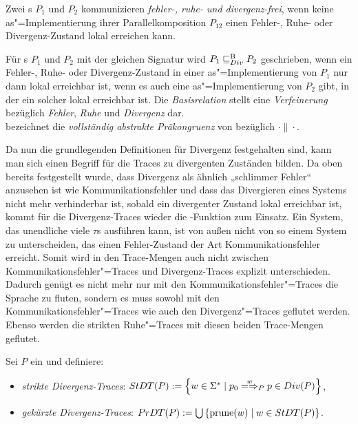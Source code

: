 \begin{Def}
  Zwei \MEIO{}s $P_1$ und $P_2$ kommunizieren \emph{fehler-, ruhe- und
  divergenz-frei}, wenn keine as"=Implementierung ihrer Parallelkomposition
  $P_{12}$ einen Fehler-, Ruhe- oder Divergenz-Zustand lokal erreichen kann.
\end{Def}

\begin{Def}
  Für \MEIO{}s $P_1$ und $P_2$ mit der gleichen Signatur wird $P_1 \sqsubseteq  _{Div}^\mathrm{B}{} P_2$
  geschrieben, wenn ein Fehler-, Ruhe- oder Divergenz-Zustand in einer
  as"=Implementierung von $P_1$ nur dann lokal erreichbar ist, wenn es auch
  eine as"=Implementierung von $P_2$ gibt, in der ein solcher lokal erreichbar
  ist. Die \emph{Basisrelation} stellt eine \emph{Verfeinerung} bezüglich
  \emph{Fehler}, \emph{Ruhe} und \emph{Divergenz} dar.\\
  \DCRel{} bezeichnet die \emph{vollständig abstrakte Präkongruenz} von
  \DBRel{} bezüglich $\cdot\|\cdot$.
\end{Def}

Da nun die grundlegenden Definitionen für Divergenz festgehalten sind, kann man
sich einen Begriff für die Traces zu divergenten Zuständen bilden. Da oben
bereits festgestellt wurde, dass Divergenz als ähnlich „schlimmer Fehler“
anzusehen ist wie Kommunikationsfehler und dass das Divergieren eines Systems
nicht mehr verhinderbar ist, sobald ein divergenter Zustand lokal erreichbar
ist, kommt für die Divergenz-Traces wieder die \prune{}-Funktion zum Einsatz. Ein
System, das unendliche viele $\tau$s ausführen kann, ist von außen nicht von so
einem System zu unterscheiden, das einen Fehler-Zustand der Art
Kommunikationsfehler erreicht. Somit wird in den Trace-Mengen auch nicht
zwischen Kommunikationsfehler"=Traces und Divergenz-Traces explizit
unterschieden. Dadurch genügt es nicht mehr nur mit den
Kommunikationsfehler"=Traces die Sprache zu fluten, sondern es muss sowohl mit den
Kommunikationsfehler"=Traces wie auch den Divergenz"=Traces geflutet werden.
Ebenso werden die strikten Ruhe"=Traces mit diesen beiden Trace-Mengen
geflutet.

\begin{Def}
  Sei $P$ ein \MEIO{} und definiere:
  \begin{itemize}
    \item \emph{strikte Divergenz-Traces}: $\StDT (P) := \left\{w\in\Sigma
      ^*\mid p_0\weakmay[w]_P p\in Div(P)\right\}$,
    \item \emph{gekürzte Divergenz-Traces}: $PrDT (P) := \bigcup\left\{\mathrm{prune}
      (w)\mid w\in StDT (P)\right\}$.
  \end{itemize}
\end{Def}

